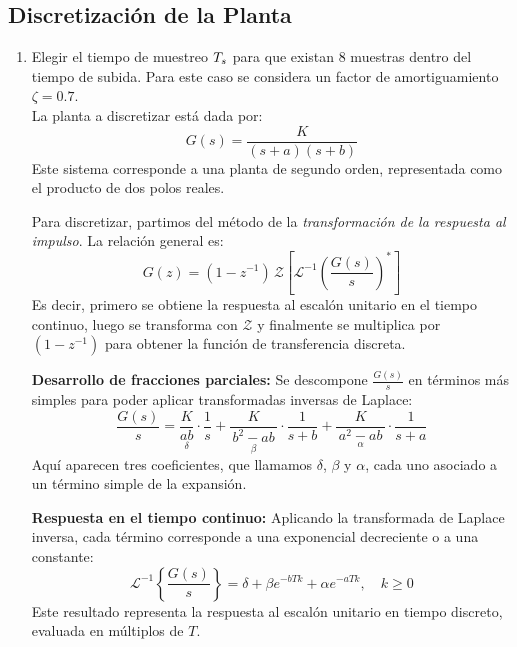 \subsection{Discretización de la Planta}
\begin{enumerate}[label=2.\arabic*.]
	\item Elegir el tiempo de muestreo $T_s$ para que existan 8 muestras dentro del tiempo de subida. Para este caso se considera un factor de amortiguamiento $\zeta = 0.7$. \\
	
	La planta a discretizar está dada por:
	\begin{equation}
		G(s) = \frac{K}{(s+a)(s+b)}
	\end{equation}
	Este sistema corresponde a una planta de segundo orden, representada como el producto de dos polos reales.
	
	Para discretizar, partimos del método de la \emph{transformación de la respuesta al impulso}. La relación general es:
	\begin{equation}
		G(z)=(1 - z^{-1})\,\mathcal{Z}\left[\mathcal{L}^{-1}\left(\frac{G(s)}{s}\right)^*\right]
		\label{eq:DiscGz}
	\end{equation}
	Es decir, primero se obtiene la respuesta al escalón unitario en el tiempo continuo, luego se transforma con $\mathcal{Z}$ y finalmente se multiplica por $(1-z^{-1})$ para obtener la función de transferencia discreta.
	
	\vspace{0.5em}
	\textbf{Desarrollo de fracciones parciales:}  
	Se descompone $\tfrac{G(s)}{s}$ en términos más simples para poder aplicar transformadas inversas de Laplace:
	\begin{equation}
		\frac{G(s)}{s} =
		\underset{\delta}{\frac{K}{ab}} \cdot \frac{1}{s}
		+ \underset{\beta}{\frac{K}{\,b^2-ab\,}} \cdot \frac{1}{s+b}
		+ \underset{\alpha}{\frac{K}{\,a^2-ab\,}} \cdot \frac{1}{s+a}
	\end{equation}
	Aquí aparecen tres coeficientes, que llamamos $\delta$, $\beta$ y $\alpha$, cada uno asociado a un término simple de la expansión.
	
	\vspace{0.5em}
	\textbf{Respuesta en el tiempo continuo:}  
	Aplicando la transformada de Laplace inversa, cada término corresponde a una exponencial decreciente o a una constante:
	\begin{equation}
		\mathcal{L}^{-1} \left\{\frac{G(s)}{s}\right\}=\delta + \beta e^{-bTk}+\alpha e^{-aTk}, \quad k \geq 0
	\end{equation}
	Este resultado representa la respuesta al escalón unitario en tiempo discreto, evaluada en múltiplos de $T$.
	

\end{enumerate}
